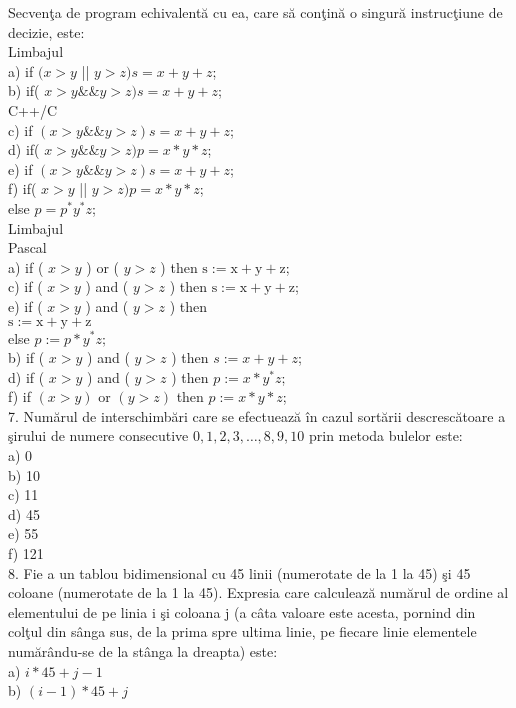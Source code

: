 Secvenţa de program echivalentă cu ea, care să conţină o singură instrucţiune de decizie, este:\\
Limbajul\\
a) if $(x>y$ || $y>z) s=x+y+z$;\\
b) if( $x>y \& \& y>z) s=x+y+z$;\\
C++/C\\
c) if $(x>y \& \& y>z) s=x+y+z$;\\
d) if( $x>y \& \& y>z) p=x * y * z$;\\
e) if $(x>y \& \& y>z) s=x+y+z$;\\
f) if( $x>y$ || $y>z) p=x * y * z$;\\
else $p=p^{*} y^{*} z$;\\
Limbajul\\
Pascal\\
a) if ( $x>y$ ) or ( $y>z$ ) then $\mathrm{s}:=\mathrm{x}+\mathrm{y}+\mathrm{z}$;\\
c) if ( $x>y$ ) and ( $y>z$ ) then $\mathrm{s}:=\mathrm{x}+\mathrm{y}+\mathrm{z}$;\\
e) if ( $x>y$ ) and ( $y>z$ ) then\\
$\mathrm{s}:=\mathrm{x}+\mathrm{y}+\mathrm{z}$\\
else $p:=p * y^{*} z ;$\\
b) if ( $x>y$ ) and ( $y>z$ ) then $s:=x+y+z$;\\
d) if ( $x>y$ ) and ( $y>z$ ) then $p:=x * y^{*} z$;\\
f) if $(x>y)$ or $(y>z)$ then $p:=x * y * z$;\\
7. Numărul de interschimbări care se efectuează în cazul sortării descrescătoare a şirului de numere consecutive $0,1,2,3, \ldots, 8,9,10$ prin metoda bulelor este:\\
a) 0\\
b) 10\\
c) 11\\
d) 45\\
e) 55\\
f) 121\\
8. Fie a un tablou bidimensional cu 45 linii (numerotate de la 1 la 45) şi 45 coloane (numerotate de la 1 la 45). Expresia care calculează numărul de ordine al elementului de pe linia i şi coloana j (a câta valoare este acesta, pornind din colţul din sânga sus, de la prima spre ultima linie, pe fiecare linie elementele numărându-se de la stânga la dreapta) este:\\
a) $i * 45+j-1$\\
b) $(i-1) * 45+j$\\
